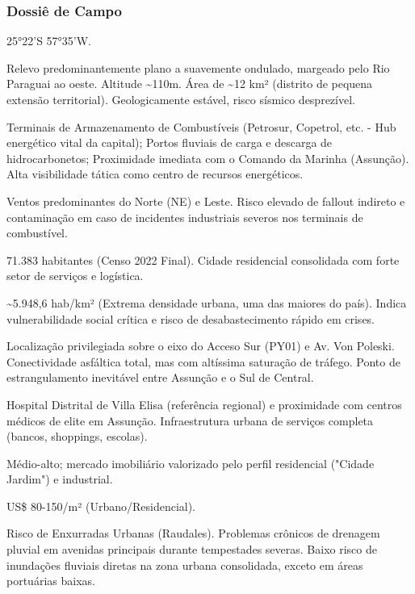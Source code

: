 \subsubsection{Dossiê de Campo}
\begin{description}[style=nextline,leftmargin=0.5cm,font=\bfseries]
\item[Coordenadas]  25°22'S 57°35'W.
\item[Topografia]  Relevo predominantemente plano a suavemente ondulado, margeado pelo Rio Paraguai ao oeste. Altitude \textasciitilde 110m. Área de \textasciitilde 12 km² (distrito de pequena extensão territorial). Geologicamente estável, risco sísmico desprezível.
\item[Alvos Estratégicos]  Terminais de Armazenamento de Combustíveis (Petrosur, Copetrol, etc. - Hub energético vital da capital); Portos fluviais de carga e descarga de hidrocarbonetos; Proximidade imediata com o Comando da Marinha (Assunção). Alta visibilidade tática como centro de recursos energéticos.
\item[Fallout]  Ventos predominantes do Norte (NE) e Leste. Risco elevado de fallout indireto e contaminação em caso de incidentes industriais severos nos terminais de combustível.
\item[População]  71.383 habitantes (Censo 2022 Final). Cidade residencial consolidada com forte setor de serviços e logística.
\item[Densidade]  \textasciitilde 5.948,6 hab/\allowbreak km² (Extrema densidade urbana, uma das maiores do país). Indica vulnerabilidade social crítica e risco de desabastecimento rápido em crises.
\item[Vias de Acesso]  Localização privilegiada sobre o eixo do Acceso Sur (PY01) e Av. Von Poleski. Conectividade asfáltica total, mas com altíssima saturação de tráfego. Ponto de estrangulamento inevitável entre Assunção e o Sul de Central.
\item[Serviços]  Hospital Distrital de Villa Elisa (referência regional) e proximidade com centros médicos de elite em Assunção. Infraestrutura urbana de serviços completa (bancos, shoppings, escolas).
\item[Custo de Vida]  Médio-alto; mercado imobiliário valorizado pelo perfil residencial ("Cidade Jardim") e industrial.
\item[Preço da Terra]  US\$ 80-150/\allowbreak m² (Urbano/\allowbreak Residencial).
\item[Hidrologia]  Risco de Enxurradas Urbanas (Raudales). Problemas crônicos de drenagem pluvial em avenidas principais durante tempestades severas. Baixo risco de inundações fluviais diretas na zona urbana consolidada, exceto em áreas portuárias baixas.

\end{description}
